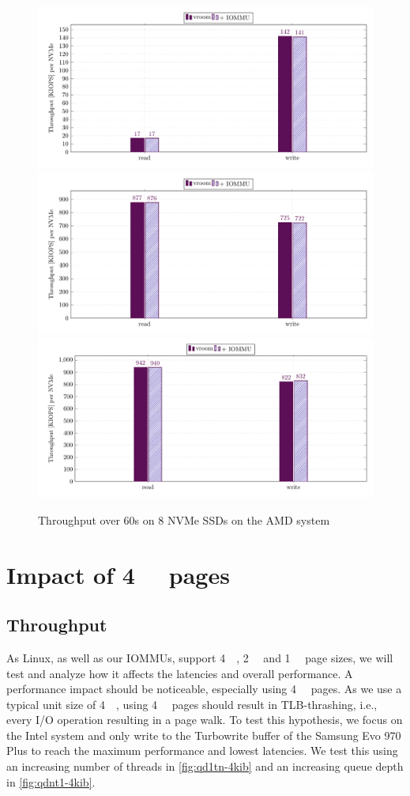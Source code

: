 \begin{figure}[H]
  \centering
   {\includegraphics[width=.7\textwidth]{figures/throughput_bar_qd1t1_8nvmes} }
   {\includegraphics[width=.7\textwidth]{figures/throughput_bar_qd32t4_8nvmes} }
   {\includegraphics[width=.7\textwidth]{figures/throughput_bar_qd128t16_8nvmes} }
  \caption{Throughput over 60s on 8 NVMe SSDs on the AMD system}
  \label{fig:throughput-bar-8n}
\end{figure}

\section{Impact of \qty{4}{\kibi\byte} pages}
\subsection{Throughput}
As Linux, as well as our IOMMUs, support \qty{4}{\kibi\byte}, \qty{2}{\mebi\byte} and \qty{1}{\gibi\byte} page sizes, we will test and analyze how it affects the latencies and overall performance. A performance impact should be noticeable, especially using \qty{4}{\kibi\byte} pages. As we use a typical unit size of \qty{4}{\kibi\byte}, using \qty{4}{\kibi\byte} pages should result in TLB-thrashing, i.e., every I/O operation resulting in a page walk. To test this hypothesis, we focus on the Intel system and only write to the Turbowrite buffer of the Samsung Evo 970 Plus to reach the maximum performance and lowest latencies. We test this using an increasing number of threads in \autoref{fig:qd1tn-4kib} and an increasing queue depth in \autoref{fig:qdnt1-4kib}.

